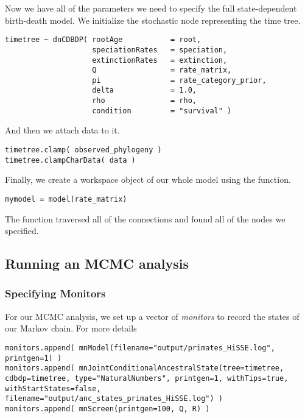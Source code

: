 Now we have all of the parameters we need to specify the full state-dependent birth-death model. 
We initialize the stochastic node representing the time tree.
{\tt \begin{snugshade*}
\begin{lstlisting}
timetree ~ dnCDBDP( rootAge           = root,
                    speciationRates   = speciation,
                    extinctionRates   = extinction, 
                    Q                 = rate_matrix,
                    pi                = rate_category_prior,
                    delta             = 1.0,
                    rho               = rho,
                    condition         = "survival" )
\end{lstlisting}
\end{snugshade*}}
And then we attach data to it.
{\tt \begin{snugshade*}
\begin{lstlisting}
timetree.clamp( observed_phylogeny )
timetree.clampCharData( data )
\end{lstlisting}
\end{snugshade*}}

Finally, we create a workspace object of our whole model using the  function. 
{\tt \begin{snugshade*}
\begin{lstlisting}
mymodel = model(rate_matrix)
\end{lstlisting}
\end{snugshade*}}

The  function traversed all of the connections and found all of the nodes we specified. 


\subsection{Running an MCMC analysis}

\subsubsection{Specifying Monitors}

For our MCMC analysis, we set up a vector of \emph{monitors} to record the states of our Markov chain. 
For more details 
{\tt \begin{snugshade*}
\begin{lstlisting}
monitors.append( mnModel(filename="output/primates_HiSSE.log", printgen=1) )
monitors.append( mnJointConditionalAncestralState(tree=timetree, cdbdp=timetree, type="NaturalNumbers", printgen=1, withTips=true, withStartStates=false, filename="output/anc_states_primates_HiSSE.log") )
monitors.append( mnScreen(printgen=100, Q, R) )
\end{lstlisting}
\end{snugshade*}}

